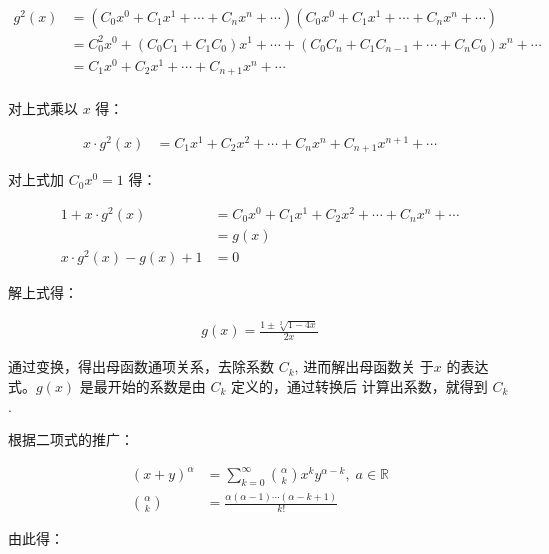 \begin{align*}
  g^2(x) &= (C_0x^0 + C_1x^1 + \cdots + C_nx^n + \cdots)(C_0x^0 + C_1x^1 +
           \cdots + C_nx^n + \cdots) \\
         &= C_0^2x^0 + (C_0C_1 + C_1C_0)x^1 + \cdots + (C_0C_n +
           C_1C_{n-1} + \cdots + C_nC_0)x^n + \cdots \\
         &= C_1x^0 + C_2x^1 + \cdots + C_{n+1}x^n + \cdots \\
\end{align*}

对上式乘以 $x$ 得：

\begin{align*}
    x \cdot g^2(x) &= C_1x^1 + C_2x^2 + \cdots + C_nx^n + C_{n+1}x^{n+1} + \cdots
\end{align*}

对上式加 $C_0x^0 = 1$ 得：

\begin{align*}
  1 + x \cdot g^2(x) &= C_0x^0 + C_1x^1 + C_2x^2 + \cdots + C_nx^n
                       + \cdots \\
                     &= g(x) \\
  x \cdot g^2(x) - g(x) + 1 &= 0
\end{align*}

解上式得：

\begin{align*}
  g(x) = \frac{1 \pm \sqrt[2]{1-4x}}{2x}
\end{align*}

通过变换，得出母函数通项关系，去除系数 $C_k$, 进而解出母函数关
于$x$ 的表达式。$g(x)$ 是最开始的系数是由 $C_k$ 定义的，通过转换后
计算出系数，就得到 $C_k$.

根据二项式的推广：

\begin{align*}
  (x + y)^\alpha &= \sum_{k=0}^\infty \binom{\alpha}{k} x^k
                   y^{\alpha - k},\; a \in \mathbb{R} \\
  \binom{\alpha}{k} &= \frac{\alpha (\alpha - 1)\cdots(\alpha - k
                      + 1)}{k!}
\end{align*}

由此得：

